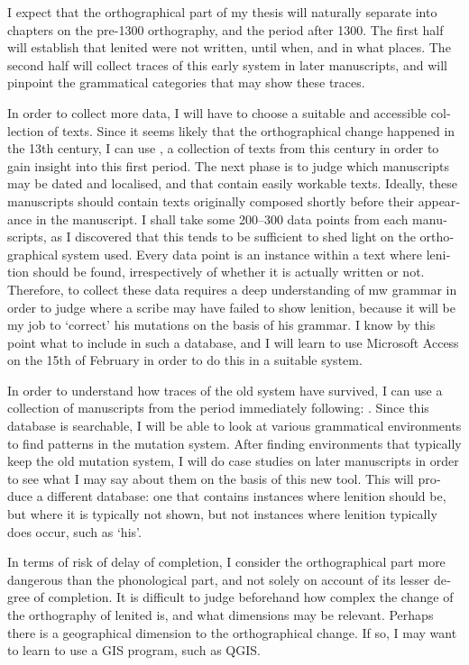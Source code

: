 \begin{english}
I expect that the orthographical part of my thesis will naturally separate into chapters on the pre-1300 orthography, and the period after 1300. The first half will establish that lenited  were not written, until when, and in what places. The second half will collect traces of this early system in later manuscripts, and will pinpoint the grammatical categories that may show these traces.

In order to collect more data, I will have to choose a suitable and accessible collection of texts. Since it seems likely that the orthographical change happened in the 13th century, I can use \textcite{isaac_rhyddiaith_2013}, a collection of texts from this century in order to gain insight into this first period. The next phase is to judge which manuscripts may be dated and localised, and that contain easily workable texts. Ideally, these manuscripts should contain texts originally composed shortly before their appearance in the manuscript. I shall take some 200--300 data points from each manuscripts, as I discovered that this tends to be sufficient to shed light on the orthographical system used. Every data point is an instance within a text where lenition should be found, irrespectively of whether it is actually written or not. Therefore, to collect these data requires a deep understanding of \gls{mw} grammar in order to judge where a scribe may have failed to show lenition, because it will be my job to `correct' his mutations on the basis of his grammar. I know by this point what to include in such a database, and I will learn to use Microsoft Access on the 15th of February in order to do this in a suitable system.

In order to understand how traces of the old system have survived, I can use a collection of manuscripts from the period immediately following: \textcite{luft_rhyddiaith_2013}. Since this database is searchable, I will be able to look at various grammatical environments to find patterns in the mutation system. After finding environments that typically keep the old mutation system, I will do case studies on later manuscripts in order to see what I may say about them on the basis of this new tool. This will produce a different database: one that contains instances where lenition should be, but where it is typically not shown, but not instances where lenition typically does occur, such as  `his'.

In terms of risk of delay of completion, I consider the orthographical part more dangerous than the phonological part, and not solely on account of its lesser degree of completion. It is difficult to judge beforehand how complex the change of the orthography of lenited  is, and what dimensions may be relevant. Perhaps there is a geographical dimension to the orthographical change. If so, I may want to learn to use a GIS program, such as QGIS.


\end{english}
